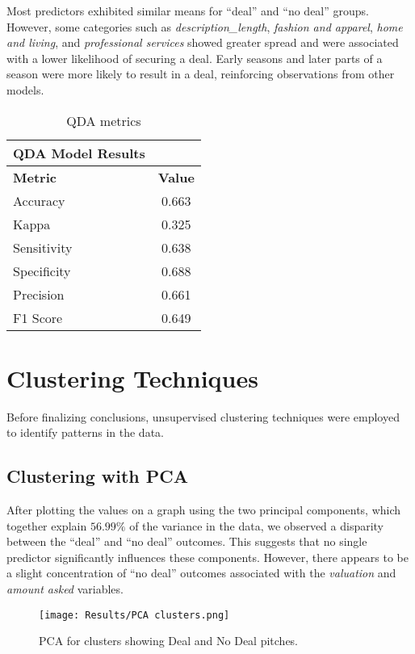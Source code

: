 \documentclass{article}
\begin{document}
Most predictors exhibited similar means for ``deal'' and ``no deal'' groups. However, some categories such as \textit{description\_length}, \textit{fashion and apparel}, \textit{home and living}, and \textit{professional services} showed greater spread and were associated with a lower likelihood of securing a deal. Early seasons and later parts of a season were more likely to result in a deal, reinforcing observations from other models.

\begin{table}[H]
    \centering
    \begin{tabular}{lc}
        \hline
        \textbf{QDA Model Results} & \\ \hline
        \textbf{Metric} & \textbf{Value} \\ \hline
        Accuracy        & 0.663 \\
        Kappa           & 0.325 \\
        Sensitivity     & 0.638 \\
        Specificity     & 0.688 \\
        Precision       & 0.661 \\
        F1 Score        & 0.649 \\ \hline
    \end{tabular}
    \caption{QDA metrics}
    \label{tab:qda_metrics}
\end{table}


\section{Clustering Techniques}

Before finalizing conclusions, unsupervised clustering techniques were employed to identify patterns in the data.

\subsection{Clustering with PCA}

After plotting the values on a graph using the two principal components, which together explain $56.99\%$ of the variance in the data, we observed a disparity between the ``deal'' and ``no deal'' outcomes. This suggests that no single predictor significantly influences these components. However, there appears to be a slight concentration of ``no deal'' outcomes associated with the \textit{valuation} and \textit{amount asked} variables.

\begin{figure}[H]
    \centering
    \texttt{[image: Results/PCA clusters.png]} %
    \caption{PCA for clusters showing Deal and No Deal pitches.}
    \label{fig:pca_clusters}
\end{figure}
\end{document}
